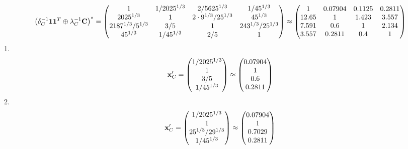 \documentclass[10pt,a4paper]{article}
\begin{document}
	\[
		\left(\delta_{C}^{-1}\bold{11}^T \oplus \lambda_{C}^{-1}\bold{C}\right)^* = 
		\begin{pmatrix}
			{1}{} & {1} / {{2025^ {1 / 3}}} & {{2}} / {{5625^ {1 / 3}}} & {1} / {{45^ {1 / 3}}} \\
			{{2025^ {1 / 3}}}{} & {1}{} & {{2} \cdot {9^ {1 / 3}}} / {{25^ {1 / 3}}} & {{45^ {1 / 3}}}{} \\
			{{2187^ {1 / 3}}} / {{5^ {1 / 3}}} & {{3}} / {{5}} & {1}{} & {{243^ {1 / 3}}} / {{25^ {1 / 3}}} \\
			{{45^ {1 / 3}}}{} & {1} / {{45^ {1 / 3}}} & {{2}} / {{5}} & {1}{} \\
		\end{pmatrix}
		\approx
		\begin{pmatrix}
			1        & 0.07904  & 0.1125   & 0.2811   \\
			12.65    & 1        & 1.423    & 3.557    \\
			7.591    & 0.6      & 1        & 2.134    \\
			3.557    & 0.2811   & 0.4      & 1        \\
		\end{pmatrix}
	\]
	1.
	\[
		\bold{x}'_{C} = 
		\begin{pmatrix}
			{1} / {{2025^ {1 / 3}}} \\
			{1}{} \\
			{{3}} / {{5}} \\
			{1} / {{45^ {1 / 3}}} \\
		\end{pmatrix}
		\approx
		\begin{pmatrix}
			0.07904  \\
			1        \\
			0.6      \\
			0.2811   \\
		\end{pmatrix}
	\]
	2.
	\[
		\bold{x}'_{C} = 
		\begin{pmatrix}
			{1} / {{2025^ {1 / 3}}} \\
			{1}{} \\
			{{25^ {1 / 3}}} / {{2}{9^ {1 / 3}}} \\
			{1} / {{45^ {1 / 3}}} \\
		\end{pmatrix}
		\approx
		\begin{pmatrix}
			0.07904  \\
			1        \\
			0.7029   \\
			0.2811   \\
		\end{pmatrix}
	\]
\end{document}
